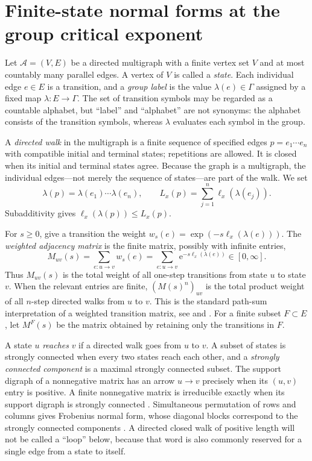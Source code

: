 \documentclass[11pt]{article}
\theoremstyle{definition}
\newcommand{\e}{\mathrm e}
\begin{document}
\section{Finite-state normal forms at the group critical exponent}
\label{sec:finite-state}

Let $\mathcal A=(V,E)$ be a directed multigraph with a finite vertex set $V$ and at most
countably many parallel edges.  A vertex of $V$ is called a \emph{state}.  Each individual
edge $e\in E$ is a transition, and a \emph{group label} is the value
$\lambda(e)\in\Gamma$ assigned by a fixed map $\lambda:E\to\Gamma$.  The set of transition
symbols may be regarded as a countable alphabet, but ``label'' and ``alphabet'' are not
synonyms: the alphabet consists of the transition symbols, whereas $\lambda$ evaluates each
symbol in the group.

A \emph{directed walk} in the multigraph is a finite sequence of specified edges
$p=e_1\cdots e_n$ with compatible initial and terminal states; repetitions are allowed.  It is
closed when its initial and terminal states agree.  Because the graph is a multigraph, the individual edges---not merely the sequence of states---are part of the walk.  We set
\[
 \lambda(p)=\lambda(e_1)\cdots\lambda(e_n),
 \qquad
 L_x(p)=\sum_{j=1}^n\ell_x(\lambda(e_j)).
\]
Subadditivity gives $\ell_x(\lambda(p))\le L_x(p)$.

For $s\ge0$, give a transition the weight
$w_s(e)=\exp(-s\ell_x(\lambda(e)))$.  The \emph{weighted adjacency matrix} is the finite
matrix, possibly with infinite entries,
\begin{equation}\label{eq:finite-state-matrix}
 M_{uv}(s)=\sum_{e:u\to v}w_s(e)
 =\sum_{e:u\to v}\e^{-s\ell_x(\lambda(e))}\in[0,\infty].
\end{equation}
Thus $M_{uv}(s)$ is the total weight of all one-step transitions from state $u$ to state $v$.
When the relevant entries are finite, $(M(s)^n)_{uv}$ is the total product weight of all
$n$-step directed walks from $u$ to $v$.  This is the standard path-sum
interpretation of a weighted transition matrix, see
\cite[Sections~1.1--1.2]{DrosteKuichVogler2009} and
\cite[Section~2]{Mohri2009}.  For a finite subset $F\subset E$, let $M^F(s)$ be the matrix
obtained by retaining only the transitions in $F$.

A state $u$ \emph{reaches} $v$ if a directed walk goes from $u$ to $v$.  A subset of states
is strongly connected when every two states reach each other, and a \emph{strongly connected
component} is a maximal strongly connected subset.  The support digraph of a nonnegative
matrix has an arrow $u\to v$ precisely when its $(u,v)$ entry is positive.  A finite
nonnegative matrix is irreducible exactly when its support digraph is strongly connected
\cite[Theorem~3.2.1]{BrualdiRyser1991}.  Simultaneous permutation of rows and columns gives
Frobenius normal form, whose diagonal blocks correspond to the strongly connected components
\cite[Theorem~3.2.4]{BrualdiRyser1991}.  A directed closed walk of positive length will not be
called a ``loop'' below, because that word is also commonly reserved for a single edge from a
state to itself.
\end{document}
